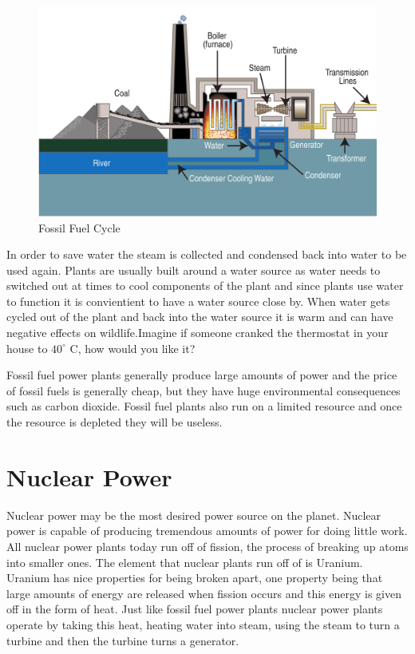 \documentclass[msc,oneside]{ubcthesis}%
\begin{document}
   \begin{figure}[hbt] \label{FossilFuelCycle} 
  \centering    
    \includegraphics[width=1\textwidth]{fossil_fuel}
    \caption[Fossil Fuel Cycle]{Fossil Fuel Cycle}  
    
\end{figure}

\newpage

In order to save water the steam is collected and condensed back into water to be used again. Plants are 
usually built around a water source as water needs to switched out at times to cool components of the plant 
and since plants use water to function it is convientient to have a water source close by. When water gets cycled out of the plant and back into the water source it is warm and can have negative effects on wildlife.Imagine if someone cranked the thermostat in your house to $40^\circ$ C, how would you like it?

Fossil fuel power plants generally produce large amounts of power and the price of fossil fuels is generally cheap, but they have huge environmental consequences such as carbon dioxide. Fossil fuel plants also run on a limited resource and once the resource is depleted they will be useless.

 \section{Nuclear Power}

 Nuclear power may be the most desired power source on the planet. Nuclear power is capable of producing tremendous amounts of power for doing little work. All nuclear power plants today run off of fission, the process of breaking up atoms into smaller ones. The element that nuclear plants run off of is Uranium. Uranium has nice properties for being broken apart, one property being that large amounts of energy are released when fission occurs and this energy is given off in the form of heat. Just like fossil fuel 
 power plants nuclear power plants operate by taking this heat, heating water into steam, using the steam 
 to turn a turbine and then the turbine turns a generator.
\end{document}
